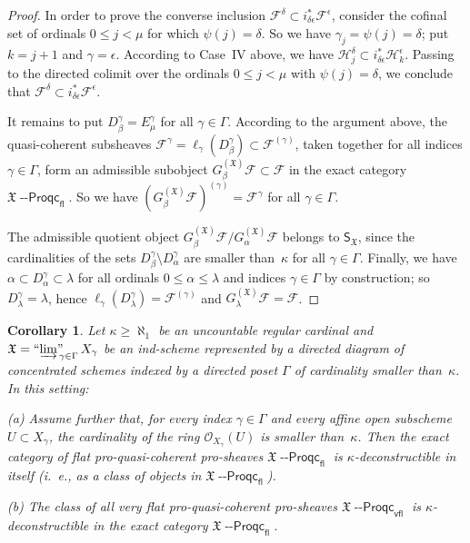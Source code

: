 \documentclass[12pt,a4paper]{amsart}
\newcommand{\+}{\protect\nobreakdash-}
\renewcommand{\:}{\colon}
\newcommand{\Proqc}{{\operatorname{\mathsf{--Proqc}}}}
\newcommand{\fl}{\mathsf{fl}}
\newcommand{\vfl}{\mathsf{vfl}}
\newcommand{\ilim}
 {\mathop{\text{\normalfont``$\varinjlim$''\!\!}}\nolimits}
\newcommand{\sS}{\mathsf S}
\newcommand{\cO}{\mathcal O}
\newcommand{\cF}{\mathcal F}
\newcommand{\cH}{\mathcal H}
\newcommand{\fX}{\mathfrak X}
\newcommand{\rF}{\mathscr F}
\theoremstyle{plain}
\newtheorem{cor}[thm]{Corollary}
\theoremstyle{definition}
\begin{document}
\begin{proof}
 In order to prove the converse inclusion $\cF^\delta\subset
i^*_{\delta\epsilon}\cF^\epsilon$, consider the cofinal set of ordinals
$0\le j<\mu$ for which $\psi(j)=\delta$.
 So we have $\gamma_j=\psi(j)=\delta$; put $k=j+1$ and
$\gamma=\epsilon$.
 According to Case~IV above, we have $\cH_j^\delta\subset
i_{\delta\epsilon}^*\cH_k^\epsilon$.
 Passing to the directed colimit over the ordinals $0\le j<\mu$
with $\psi(j)=\delta$, we conclude that
$\cF^\delta\subset i^*_{\delta\epsilon}\cF^\epsilon$.

 It remains to put $D_\beta^\gamma=E_\mu^\gamma$ for all
$\gamma\in\Gamma$.
 According to the argument above, the quasi-coherent subsheaves
$\cF^\gamma=\ell_\gamma(D_\beta^\gamma)\subset\rF^{(\gamma)}$,
taken together for all indices $\gamma\in\Gamma$, form an admissible
subobject $G^{(\fX)}_\beta\rF\subset\rF$ in the exact category
$\fX\Proqc_\fl$.
 So we have $(G^{(\fX)}_\beta\rF)^{(\gamma)}=\cF^\gamma$ for all
$\gamma\in\Gamma$.

 The admissible quotient object
$G^{(\fX)}_\beta\rF/G^{(\fX)}_\alpha\rF$ belongs to $\sS_\fX$,
since the cardinalities of the sets $D_\beta^\gamma\setminus
D_\alpha^\gamma$ are smaller than~$\kappa$ for all $\gamma\in\Gamma$.
 Finally, we have $\alpha\subset D_\alpha^\gamma\subset\lambda$ for
all ordinals $0\le\alpha\le\lambda$ and indices $\gamma\in\Gamma$
by construction; so $D_\lambda^\gamma=\lambda$, hence
$\ell_\gamma(D_\lambda^\gamma)=\rF^{(\gamma)}$ and
$G^{(\fX)}_\lambda\rF=\rF$.
\end{proof}

\begin{cor} \label{flat-vfl-proqcoh-prosheaves-deconstructible}
 Let\/ $\kappa\ge\aleph_1$ be an uncountable regular cardinal and\/
$\fX=\ilim_{\gamma\in\Gamma}X_\gamma$ be an ind-scheme represented
by a directed diagram of concentrated schemes indexed by a directed
poset\/ $\Gamma$ of cardinality smaller than\/~$\kappa$.
 In this setting: \par
\textup{(a)} Assume further that, for every index\/ $\gamma\in\Gamma$
and every affine open subscheme $U\subset X_\gamma$, the cardinality
of the ring\/ $\cO_{X_\gamma}(U)$ is smaller than\/~$\kappa$.
 Then the exact category of flat pro-quasi-coherent pro-sheaves\/
$\fX\Proqc_\fl$ is\/ $\kappa$\+deconstructible in itself (i.~e.,
as a class of objects in\/ $\fX\Proqc_\fl$). \par
\textup{(b)} The class of all very flat pro-quasi-coherent
pro-sheaves\/ $\fX\Proqc_\vfl$ is\/ $\kappa$\+de\-con\-struct\-ible
in the exact category\/ $\fX\Proqc_\fl$.
\end{cor}
\end{document}

